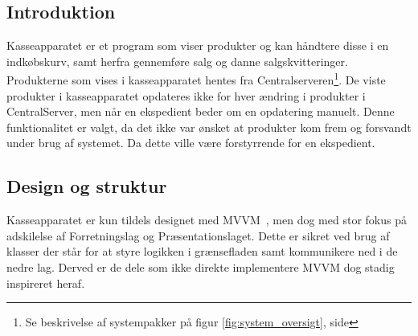 \subsection{Introduktion}
Kasseapparatet er et program som viser produkter og kan håndtere disse i en indkøbskurv, samt herfra gennemføre salg og danne salgskvitteringer. Produkterne som vises i kasseapparatet hentes fra Centralserveren\footnote{Se beskrivelse af systempakker på figur \ref{fig:system_oversigt}, side \pageref{fig:system_oversigt}}. De viste produkter i kasseapparatet opdateres ikke for hver ændring i produkter i CentralServer, men når en ekspedient beder om en opdatering manuelt. Denne funktionalitet er valgt, da det ikke var ønsket at produkter kom frem og forsvandt under brug af systemet. Da dette ville være forstyrrende for en ekspedient.


\subsection{Design og struktur}
Kasseapparatet er kun tildels designet med MVVM~\cite{MVVM}, men dog med stor fokus på adskilelse af Forretningslag og Præsentationslaget. Dette er sikret ved brug af klasser der står for at styre logikken i grænsefladen samt kommunikere ned i de nedre lag. Derved er de dele som ikke direkte implementere MVVM dog stadig inspireret heraf.